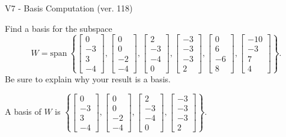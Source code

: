 \begin{exercise}
  \begin{exerciseTitle}V7 - Basis Computation (ver. 118)\end{exerciseTitle}
  \begin{exerciseStatement}
    Find a basis for the subspace 
\[W=\mathrm{span}\ \left\{\left[\begin{array}{r}
0 \\
-3 \\
3 \\
-4
\end{array}\right] , \left[\begin{array}{r}
0 \\
0 \\
-2 \\
-4
\end{array}\right] , \left[\begin{array}{r}
2 \\
-3 \\
-4 \\
0
\end{array}\right] , \left[\begin{array}{r}
-3 \\
-3 \\
-3 \\
2
\end{array}\right] , \left[\begin{array}{r}
0 \\
6 \\
-6 \\
8
\end{array}\right] , \left[\begin{array}{r}
-10 \\
-3 \\
7 \\
4
\end{array}\right]\right\}.\]
 Be sure to explain why your result is a basis.


  \end{exerciseStatement}
  \begin{exerciseAnswer}
   A basis of \(W\) is  \(\left\{\left[\begin{array}{r}
0 \\
-3 \\
3 \\
-4
\end{array}\right] , \left[\begin{array}{r}
0 \\
0 \\
-2 \\
-4
\end{array}\right] , \left[\begin{array}{r}
2 \\
-3 \\
-4 \\
0
\end{array}\right] , \left[\begin{array}{r}
-3 \\
-3 \\
-3 \\
2
\end{array}\right]\right\}\).
  


  \end{exerciseAnswer}
\end{exercise}
